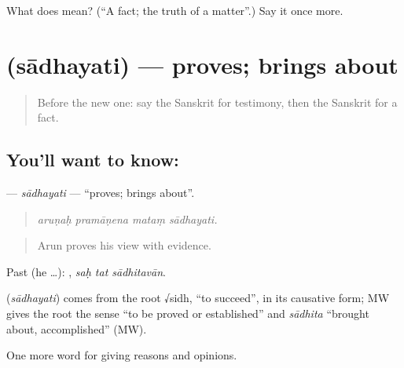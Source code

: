 \begin{tcolorbox}[breakable,colback=teal!4,colframe=teal!35!black,title={Before you move on}]
What does  mean? (\textquotedblleft{}A fact; the truth of a matter\textquotedblright{}.) Say it once more.
\end{tcolorbox}
\section[\texorpdfstring{\sk{साधयति} (sādhayati)}{साधयति (sādhayati)}]{ (sādhayati) — proves; brings about}

\label{lesson:SA-C345-sadhayati}



\begin{quote}
Before the new one: say the Sanskrit for testimony, then the Sanskrit for a fact.
\end{quote}

\subsection*{You'll want to know: }
\textbf{} — \emph{sādhayati} — \textquotedblleft{}proves; brings about\textquotedblright{}.

\begin{quote}
   
\end{quote}

\begin{quote}
\emph{aruṇaḥ pramāṇena mataṃ sādhayati.}
\end{quote}

\begin{quote}
Arun proves his view with evidence.
\end{quote}

Past (he …):   , \emph{saḥ tat sādhitavān}.

\begin{cousinweb}
\textbf{} (\emph{sādhayati}) comes from the root √sidh, \textquotedblleft{}to succeed\textquotedblright{}, in its causative form; MW gives the root the sense \textquotedblleft{}to be proved or established\textquotedblright{} and \emph{sādhita} \textquotedblleft{}brought about, accomplished\textquotedblright{} (MW).
\end{cousinweb}

\begin{grammarlens}[title={What you've built}]
One more word for giving reasons and opinions.
\end{grammarlens}

